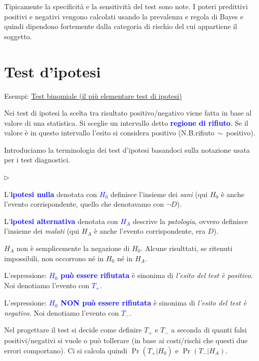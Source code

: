 \documentclass[12pt,openany]{book}
\newcommand{\mylabel}[1]{{\footnotesize\textsf{#1}}\hfill}
\renewenvironment{itemize}
  {\begin{list}{$\triangleright$}{%
   \setlength{\parskip}{0mm}
   \setlength{\topsep}{.2\baselineskip}
   \setlength{\rightmargin}{0mm}
   \setlength{\listparindent}{0mm}
   \setlength{\itemindent}{0mm}
   \setlength{\labelwidth}{3ex}
   \setlength{\itemsep}{.4\baselineskip}
   \setlength{\parsep}{0mm}
   \setlength{\partopsep}{0mm}
   \setlength{\labelsep}{1ex}
   \setlength{\leftmargin}{\labelwidth+\labelsep}
   \let\makelabel\mylabel}}{%
   \end{list}\vspace*{-1.3mm}}
\def\emph#1{\textcolor{blue}{\textbf{\boldmath #1}}}
\theoremstyle{mio}
\theoremstyle{liscio}
\begin{document}
Tipicamente la specificità e la sensitività del test sono note. I poteri predittivi positivi e negativi vengono calcolati usando la prevalenza e regola di Bayes e quindi dipendono fortemente dalla categoria di rischio del cui appartiene il soggetto.






\hfill{}\clearpage\section{Test d'ipotesi}
\label{test_ipotesi}

Esempi: \hyperref[Bernoulli_test]{Test binomiale (il più elementare test di ipotesi) \faShare}

Nei test di ipotesi la scelta tra risultato positivo/negativo viene fatta in base al valore di una statistica. Si sceglie un intervallo detto \emph{regione di rifiuto\/}. Se il valore è in questo intervallo l'esito si considera positivo (N.B.\@ rifiuto$\,\sim\,$positivo).

Introduciamo la terminologia dei test d'ipotesi basandoci sulla notazione usata per i test diagnostici.

\begin{itemize}
\item L'\emph{ipotesi nulla\/} denotata con \emph{$H_0$} definisce l'insieme dei \textit{sani\/} (qui $H_0$ è anche l'evento corrispondente, quello che denotavamo con $\neg D$). 

\item L'\emph{ipotesi alternativa\/} denotata con \emph{$H_A$}  descrive la \textit{patologia}, ovvero definisce l'insieme dei \textit{malati\/} (qui $H_A$ è anche l'evento corrispondente, era $D$).

\item $H_A$ non è semplicemente la negazione di $H_0$. Alcune risulttati, se ritenuti impossibili, non occorrono né in $H_0$ né in $H_A$.

\item L'espressione: \emph{$H_0$ può essere rifiutata\/} è sinonima di \textit{l'esito del test è positivo}. Noi denotiamo l'evento con \emph{$T_+$}.


\item L'espressione: \emph{$H_0$ NON può essere rifiutata\/} è sinonima di \textit{l'esito del test è negativo}. Noi denotiamo l'evento con \emph{$T_-$}.

\item Nel progettare il test si decide come definire $T_+$ e $T_-$ a seconda di quanti falsi positivi/negativi si vuole o può tollerare (in base ai costi/rischi che questi due errori comportano). Ci si calcola quindi $\Pr(T_+|H_0)$ e $\Pr(T_-|H_A)$.
\end{itemize}
\end{document}
